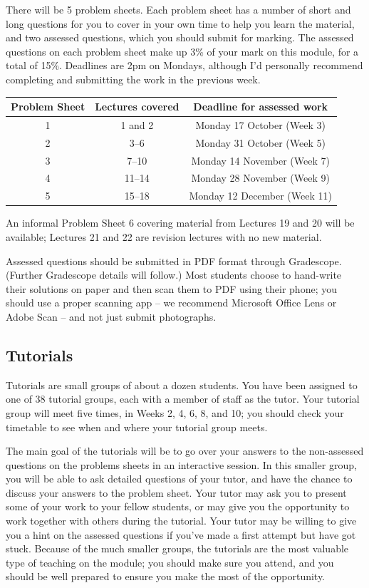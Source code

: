 \documentclass[
  letterpaper,
]{report}
\theoremstyle{definition}
\theoremstyle{definition}
\theoremstyle{remark}
\begin{document}
There will be 5 problem sheets. Each problem sheet has a number of short
and long questions for you to cover in your own time to help you learn
the material, and two assessed questions, which you should submit for
marking. The assessed questions on each problem sheet make up 3\% of
your mark on this module, for a total of 15\%. Deadlines are 2pm on
Mondays, although I'd personally recommend completing and submitting the
work in the previous week.

\begin{longtable}[]{@{}ccc@{}}
\toprule()
Problem Sheet & Lectures covered & Deadline for assessed work \\
\midrule()
\endhead
1 & 1 and 2 & Monday 17 October (Week 3) \\
2 & 3--6 & Monday 31 October (Week 5) \\
3 & 7--10 & Monday 14 November (Week 7) \\
4 & 11--14 & Monday 28 November (Week 9) \\
5 & 15--18 & Monday 12 December (Week 11) \\
\bottomrule()
\end{longtable}

An informal Problem Sheet 6 covering material from Lectures 19 and 20
will be available; Lectures 21 and 22 are revision lectures with no new
material.

Assessed questions should be submitted in PDF format through Gradescope.
(Further Gradescope details will follow.) Most students choose to
hand-write their solutions on paper and then scan them to PDF using
their phone; you should use a proper scanning app -- we recommend
Microsoft Office Lens or Adobe Scan -- and not just submit photographs.

\hypertarget{tutorials}{%
\subsection*{Tutorials}\label{tutorials}}

Tutorials are small groups of about a dozen students. You have been
assigned to one of 38 tutorial groups, each with a member of staff as
the tutor. Your tutorial group will meet five times, in Weeks 2, 4, 6,
8, and 10; you should check your timetable to see when and where your
tutorial group meets.

The main goal of the tutorials will be to go over your answers to the
non-assessed questions on the problems sheets in an interactive session.
In this smaller group, you will be able to ask detailed questions of
your tutor, and have the chance to discuss your answers to the problem
sheet. Your tutor may ask you to present some of your work to your
fellow students, or may give you the opportunity to work together with
others during the tutorial. Your tutor may be willing to give you a hint
on the assessed questions if you've made a first attempt but have got
stuck. Because of the much smaller groups, the tutorials are the most
valuable type of teaching on the module; you should make sure you
attend, and you should be well prepared to ensure you make the most of
the opportunity.
\end{document}
